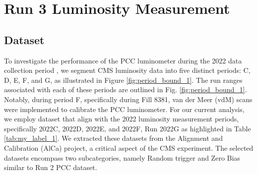 \chapter{Run 3 Luminosity Measurement}  %

\ifpdf
    \graphicspath{{Chapter1/Figs/Raster/}{Chapter1/Figs/PDF/}{Chapter1/Figs/}}
\else
    \graphicspath{{Chapter1/Figs/Vector/}{Chapter1/Figs/}}
\fi








\section{Dataset}

To investigate the performance of the PCC luminometer during the 2022 data collection period \cite{Hayrapetyan:2870088}, we segment CMS luminosity data into five distinct periods:  C, D, E, F, and G, as illustrated in Figure \ref{fig:period_bound_1}. The run ranges associated with each of these periods are outlined in Fig. \ref{fig:period_bound_1}. Notably, during period F, specifically during Fill 8381, van der Meer (vdM) scans were implemented to calibrate the PCC luminometer. For our current analysis, we employ dataset that align with the 2022 luminosity measurement periods, specifically 2022C, 2022D, 2022E, and 2022F, Run 2022G as highlighted in Table \ref{tab:my_label_1}. We extracted these datasets from the Alignment and Calibration (AlCa) project, a critical aspect of the CMS experiment. The selected datasets encompass two subcategories, namely Random trigger and Zero Bias similar to Run 2 PCC dataset. %


